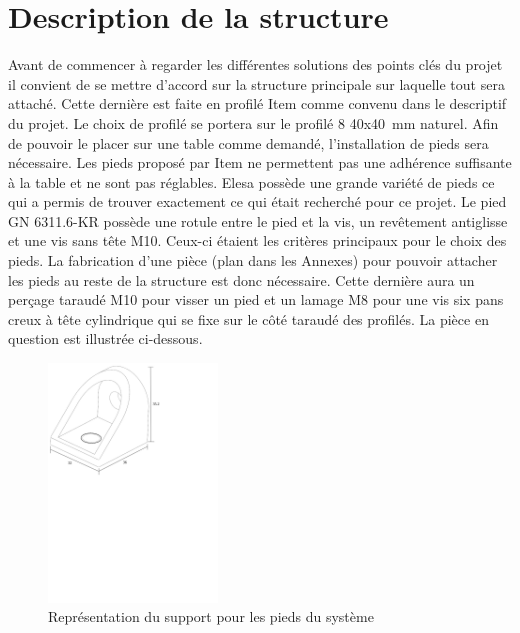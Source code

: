 \section{Description de la structure}\label{sec:DescStruct}
Avant de commencer à regarder les différentes solutions des points clés du projet il convient de se mettre d'accord
sur la structure principale sur laquelle tout sera attaché. Cette dernière est faite en profilé Item \cite{Item} comme convenu dans le descriptif
du projet. Le choix de profilé se portera sur le profilé 8 40x40~mm naturel. Afin de pouvoir le placer sur une table comme demandé, l'installation de pieds sera nécessaire. Les pieds proposé par Item ne
permettent pas une adhérence suffisante à la table et ne sont pas réglables. Elesa \cite{Elesa} possède une grande variété de pieds ce qui
a permis de trouver exactement ce qui était recherché pour ce projet. Le pied GN 6311.6-KR possède une rotule entre le pied
et la vis, un revêtement antiglisse et une vis sans tête M10. Ceux-ci étaient les critères principaux pour le choix des pieds. La fabrication d'une pièce (plan dans les Annexes) pour pouvoir attacher
les pieds au reste de la structure est donc nécessaire. Cette dernière aura un perçage taraudé M10 pour visser un pied et un lamage M8 pour
une vis six pans creux à tête cylindrique qui se fixe sur le côté taraudé des profilés. La pièce en question est illustrée ci-dessous.

\begin{figure}[H]
  \centering
  \includegraphics[width = 0.4\textwidth]{assets/figures/SupportPieds.svg}
  \caption{Représentation du support pour les pieds du système}
  \label{fig:SupPieds}
\end{figure}

